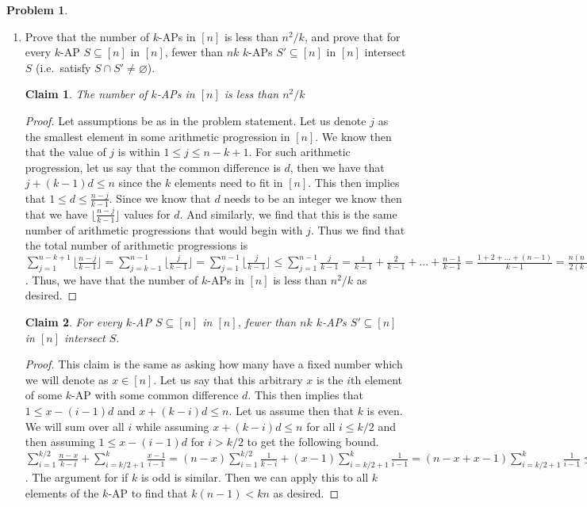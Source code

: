 \documentclass[11pt, letter]{amsart}
\newtheorem*{claim*}{Claim}
\theoremstyle{definition}
\newtheorem{problem}{Problem}[]
\begin{document}
\begin{problem}~
  \begin{enumerate}[label=(\alph*)]
  \item Prove that the number of $k$-APs in $[n]$ is less than $n^2  / k$, and prove that for every $k$-AP $S \subseteq [n]$ in $[n]$, fewer than $nk$ $k$-APs $S' \subseteq [n]$ in $[n]$ intersect $S$ (i.e.\ satisfy $S\cap S' \neq \varnothing$).

    \begin{claim*}
        The number of $k$-APs in $[n]$ is less than $n^2 / k$
    \end{claim*}
    \begin{proof}
        Let assumptions be as in the problem statement. Let us denote $j$ as the smallest element in some arithmetic progression in $[n]$. We know then that the value of $j$ is within $1 \leq j \leq n - k + 1$. For such arithmetic progression, let us say that the common difference is $d$, then we have that $j + (k - 1)d \leq n$ since the $k$ elements need to fit in $[n]$. This then implies that $1 \leq d \leq \frac{n - j}{k - 1}$. Since we know that $d$ needs to be an integer we know then that we have $\lfloor\frac{n-j}{k-1}\rfloor$ values for $d$. And similarly, we find that this is the same number of arithmetic progressions that would begin with $j$. Thus we find that the total number of arithmetic progressions is $\sum_{j = 1}^{n - k + 1} \lfloor\frac{n - j}{k - 1}\rfloor = \sum_{j = k - 1}^{n - 1}\lfloor\frac{j}{k - 1}\rfloor = \sum_{j = 1}^{n - 1}\lfloor\frac{j}{k - 1}\rfloor \leq \sum_{j = 1}^{n - 1} \frac{j}{k - 1} = \frac{1}{k - 1} + \frac{2}{k - 1} + ... + \frac{n - 1}{k - 1} = \frac{1 + 2 + ... + (n - 1)}{k - 1} = \frac{n (n - 1)}{2(k - 1)} < \frac{n^2}{k}$. Thus, we have that the number of $k$-APs in $[n]$ is less than $n^2 / k$ as desired.
    \end{proof}
    \begin{claim*}
        For every $k$-AP $S \subseteq [n]$ in $[n]$, fewer than $nk$ $k$-APs $S' \subseteq [n]$ in $[n]$ intersect $S.$
    \end{claim*}
    \begin{proof}
        This claim is the same as asking how many have a fixed number which we will denote as $x \in [n]$. Let us say that this arbitrary $x$ is the $i$th element of some $k$-AP with some common difference $d$. This then implies that $1 \leq x - (i - 1)d$ and $x + (k - i) d \leq n$. Let us assume then that $k$ is even. We will sum over all $i$ while assuming $x + (k - i)d \leq n$ for all $i \leq k/2$ and then assuming $1 \leq x - (i - 1)d$ for $i > k/2$ to get the following bound. $\sum_{i = 1}^{k/2}\frac{n - x}{k - i} + \sum_{i = k/2 + 1}^k\frac{x - 1}{i - 1} = (n - x)\sum_{i = 1}^{k/2}\frac{1}{k - i} + (x - 1)\sum_{i = k/2 + 1}^k\frac{1}{i - 1} = (n - x + x - 1)\sum_{i = k/2 + 1}^k\frac{1}{i - 1} \leq n - 1$. The argument for if $k$ is odd is similar. Then we can apply this to all $k$ elements of the $k$-AP to find that $k(n - 1) < kn$ as desired.
    \end{proof}
  

\end{enumerate}
\end{problem}
\end{document}

